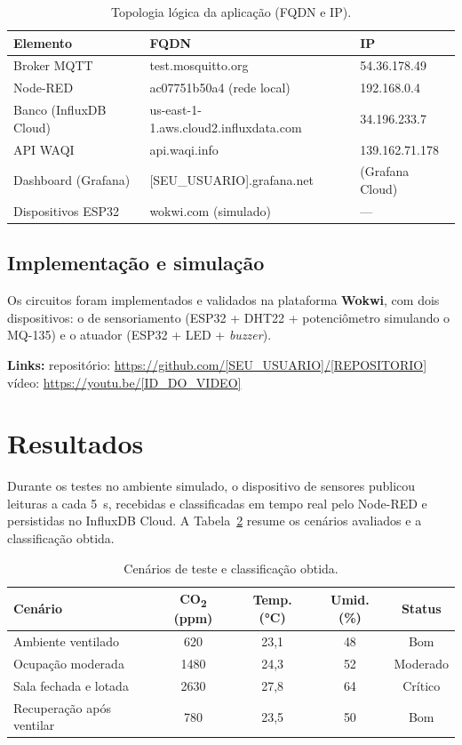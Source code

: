 \documentclass[12pt,a4paper]{article}
\begin{document}
\begin{table}[h]
  \centering
  \caption{Topologia lógica da aplicação (FQDN e IP).}
  \label{tab:topo}
  \begin{tabular}{lll}
    \toprule
    \textbf{Elemento} & \textbf{FQDN} & \textbf{IP} \\
    \midrule
    Broker MQTT & test.mosquitto.org & 54.36.178.49 \\
    Node-RED & ac07751b50a4 (rede local) & 192.168.0.4 \\
    Banco (InfluxDB Cloud) & us-east-1-1.aws.cloud2.influxdata.com & 34.196.233.7 \\
    API WAQI & api.waqi.info & 139.162.71.178 \\
    Dashboard (Grafana) & [SEU\_USUARIO].grafana.net & (Grafana Cloud) \\
    Dispositivos ESP32 & wokwi.com (simulado) & --- \\
    \bottomrule
  \end{tabular}
\end{table}

\subsection{Implementação e simulação}
Os circuitos foram implementados e validados na plataforma \textbf{Wokwi}, com dois dispositivos: o de
sensoriamento (ESP32 + DHT22 + potenciômetro simulando o MQ-135) e o atuador (ESP32 + LED + \textit{buzzer}).

\vspace{0.2cm}
\noindent\textbf{Links:} repositório: \url{https://github.com/[SEU_USUARIO]/[REPOSITORIO]} \quad
vídeo: \url{https://youtu.be/[ID_DO_VIDEO]}

\section{Resultados}

Durante os testes no ambiente simulado, o dispositivo de sensores publicou leituras a cada 5~s, recebidas
e classificadas em tempo real pelo Node-RED e persistidas no InfluxDB Cloud. A Tabela~\ref{tab:cenarios}
resume os cenários avaliados e a classificação obtida.

\begin{table}[h]
  \centering
  \caption{Cenários de teste e classificação obtida.}
  \label{tab:cenarios}
  \begin{tabular}{lcccc}
    \toprule
    \textbf{Cenário} & \textbf{CO\textsubscript{2} (ppm)} & \textbf{Temp. (°C)} & \textbf{Umid. (\%)} & \textbf{Status} \\
    \midrule
    Ambiente ventilado        & 620  & 23,1 & 48 & Bom \\
    Ocupação moderada         & 1480 & 24,3 & 52 & Moderado \\
    Sala fechada e lotada     & 2630 & 27,8 & 64 & Crítico \\
    Recuperação após ventilar & 780  & 23,5 & 50 & Bom \\
    \bottomrule
  \end{tabular}
\end{table}
\end{document}
